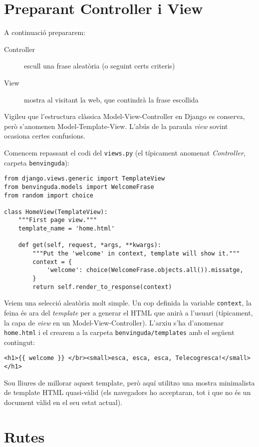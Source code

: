 \documentclass[12pt,a4paper]{article}
\begin{document}
\section{Preparant Controller i View}

A continuació prepararem:
\begin{description}
\item[Controller] escull una frase aleatòria (o seguint certs criteris)
\item[View] mostra al visitant la web, que contindrà la frase escollida
\end{description}

Vigileu que l'estructura clàssica Model-View-Controller en Django es conserva, però s'anomenen Model-Template-View. L'abús de la paraula \emph{view} sovint ocasiona certes confusions.

Comencem repassant el codi del \verb+views.py+ (el típicament anomenat \emph{Controller}, carpeta \verb+benvinguda+):

\begin{lstlisting}
from django.views.generic import TemplateView
from benvinguda.models import WelcomeFrase
from random import choice

class HomeView(TemplateView):
    """First page view."""
    template_name = 'home.html'

    def get(self, request, *args, **kwargs):
        """Put the 'welcome' in context, template will show it."""
        context = {
            'welcome': choice(WelcomeFrase.objects.all()).missatge,
        }
        return self.render_to_response(context)
\end{lstlisting}

Veiem una selecció aleatòria molt simple. Un cop definida la variable \verb+context+, la feina és ara del \emph{template} per a generar el HTML que anirà a l'usuari (típicament, la capa de \emph{view} en un Model-View-Controller). L'arxiu s'ha d'anomenar \verb+home.html+ i el crearem a la carpeta \verb+benvinguda/templates+ amb el següent contingut:

\begin{verbatim}
<h1>{{ welcome }} </br><small>esca, esca, esca, Telecogresca!</small></h1>
\end{verbatim}

Sou lliures de millorar aquest template, però aquí utilitzo una mostra minimalista de template HTML quasi-vàlid (els navegadors ho acceptaran, tot i que no és un document vàlid en el seu estat actual).

\section{Rutes}
\end{document}
